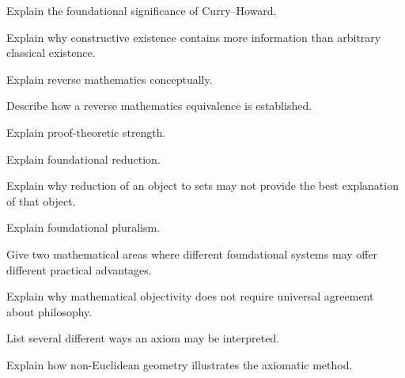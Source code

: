 \begin{exercise}[3]
Explain the foundational significance of Curry--Howard.
\end{exercise}

\begin{exercise}[3]
Explain why constructive existence contains more information than arbitrary
classical existence.
\end{exercise}

\begin{exercise}[2]
Explain reverse mathematics conceptually.
\end{exercise}

\begin{exercise}[3]
Describe how a reverse mathematics equivalence is established.
\end{exercise}

\begin{exercise}[3]
Explain proof-theoretic strength.
\end{exercise}

\begin{exercise}[3]
Explain foundational reduction.
\end{exercise}

\begin{exercise}[3]
Explain why reduction of an object to sets may not provide the best
explanation of that object.
\end{exercise}

\begin{exercise}[2]
Explain foundational pluralism.
\end{exercise}

\begin{exercise}[3]
Give two mathematical areas where different foundational systems may offer
different practical advantages.
\end{exercise}

\begin{exercise}[3]
Explain why mathematical objectivity does not require universal agreement
about philosophy.
\end{exercise}

\begin{exercise}[3]
List several different ways an axiom may be interpreted.
\end{exercise}

\begin{exercise}[3]
Explain how non-Euclidean geometry illustrates the axiomatic method.
\end{exercise}

